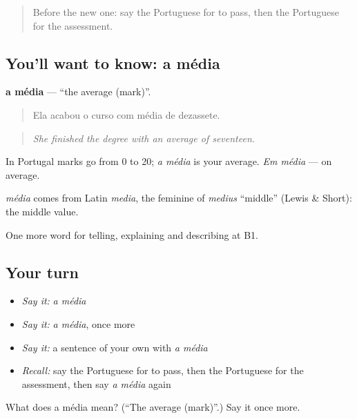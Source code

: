 \begin{quote}
Before the new one: say the Portuguese for to pass, then the Portuguese for the assessment.
\end{quote}

\subsection*{You'll want to know: a média}
\textbf{a média} — \textquotedblleft{}the average (mark)\textquotedblright{}.

\begin{quote}
Ela acabou o curso com média de dezassete.
\end{quote}

\begin{quote}
\emph{She finished the degree with an average of seventeen.}
\end{quote}

In Portugal marks go from 0 to 20; \emph{a média} is your average. \emph{Em média} — on average.

\begin{cousinweb}
\emph{média} comes from Latin \emph{media}, the feminine of \emph{medius} \textquotedblleft{}middle\textquotedblright{} (Lewis \& Short): the middle value.
\end{cousinweb}

\begin{grammarlens}[title={What you've built}]
One more word for telling, explaining and describing at B1.
\end{grammarlens}

\subsection*{Your turn}
\begin{itemize}
\raggedright
  \item \emph{Say it:} \emph{a média}
  \item \emph{Say it:} \emph{a média}, once more
  \item \emph{Say it:} a sentence of your own with \emph{a média}
  \item \emph{Recall:} say the Portuguese for to pass, then the Portuguese for the assessment, then say \emph{a média} again
\end{itemize}

\begin{tcolorbox}[breakable,colback=teal!4,colframe=teal!35!black,title={Before you move on}]
What does a média mean? (\textquotedblleft{}The average (mark)\textquotedblright{}.) Say it once more.
\end{tcolorbox}
